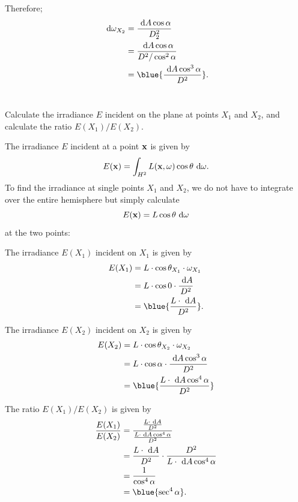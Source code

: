 \begin{problem}
\begin{enumroman}
\begin{answer}
\begin{enumarabic}
            Therefore;
            \begin{align*}
              \d \omega_{X_2} &= \frac{\d A \cos\alpha}{D_2^2} \\
              &= \frac{\d A \cos\alpha}{D^2/\cos^2\alpha} \\
              &= \blue{\frac{\d A \cos^3\alpha}{D^2}}.
            \end{align*}
            ~\label{item:1.2}
        \end{enumarabic}
      \end{answer}
    \newpage
    \item Calculate the irradiance $E$ incident on the plane at points
      $X_1$ and $X_2$, and calculate the ratio $E(X_1)/E(X_2)$.
      \begin{answer}
        The irradiance $E$ incident at a point $\mathbf{x}$ is given by
        \[
          E(\mathbf{x}) = \int_{H^2} L(\mathbf{x}, \omega) \cos\theta \text{ d}\omega.
        \]
        To find the irradiance at single points $X_1$ and $X_2$,
        we do not have to integrate over the entire hemisphere
        but simply calculate
        \[
          E(\mathbf{x}) = L \cos\theta \text{ d} \omega
        \]
        at the two points:
        \begin{enumarabic}
          \item The irradiance $E(X_1)$ incident on $X_1$ is given by
            \begin{align*}
              E(X_1) &= L \cdot \cos\theta_{X_1} \cdot \omega_{X_1} \\
              &= L \cdot \cos0 \cdot \frac{\d A}{D^2} \\
              &= \blue{ \frac{L \cdot \d A}{D^2} }.
            \end{align*}
            
          \item The irradiance $E(X_2)$ incident on $X_2$ is given by
            \begin{align*}
              E(X_2) &= L \cdot \cos \theta_{X_2} \cdot \omega_{X_2} \\
              &= L \cdot \cos\alpha \cdot \frac{\d A \cos^3\alpha}{D^2} \\
              &=\blue{\frac{L \cdot \d A \cos^4\alpha}{D^2}}
            \end{align*}

          \item The ratio $E(X_1)/E(X_2)$ is given by
            \begin{align*}
              \frac{E(X_1)}{E(X_2)} &= \frac{\frac{L \cdot \d A}{D^2}}{\frac{L \cdot \d A \cos^4\alpha}{D^2}} \\
              &= \frac{L \cdot \d A}{D^2} \cdot \frac{D^2}{L \cdot \d A \cos^4\alpha} \\
              &= \frac{1}{\cos^4\alpha} \\
              &= \blue{\sec^4\alpha}.
            \end{align*}
          \end{enumarabic}
      \end{answer}
  \end{enumroman}
\end{problem}

